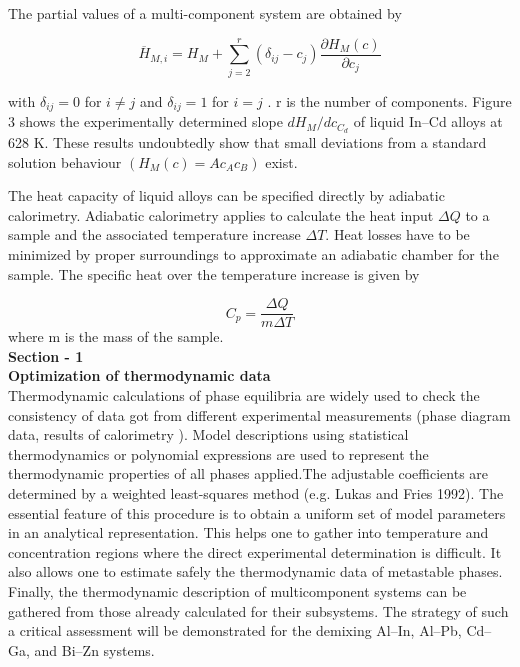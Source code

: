 \documentclass[12pt]{article}
\newcommand*{\1}{\hspace{1pt}}
\begin{document}
The partial values of a multi-component system are obtained by

    \begin{equation}
        \overline{H} _{M,i} = H _M + \sum_{j = 2}^{r} (\delta _{ij} - c _j)\frac{\partial H _M{(c)}}{\partial c _j}   
    \end{equation} 

with $ \delta  _{ij} =0 $ for $i \neq  j$ and $ \delta  _{ij} =1 $ for $i = j$ . r is the 
number of components. Figure 3 shows the experimentally determined slope $ d H _M / dc _{C _d} $ 
of liquid In–Cd alloys at 628 K. These results
undoubtedly show that small deviations from a standard solution behaviour $ (H _M (c) = Ac _Ac _B) $
exist.

The heat capacity of liquid alloys can be specified directly by adiabatic calorimetry.
Adiabatic calorimetry applies to calculate the heat input $ \Delta Q $ to a sample and the 
associated temperature increase $ \Delta T $.
Heat losses have to be minimized by proper surroundings to approximate an adiabatic
chamber for the sample. The specific heat over the temperature increase is given by 


    \begin{equation}
        C _p = \frac{\Delta Q}{m\Delta T} 
    \end{equation}   
where m is the mass of the sample.\\

\begin{adjustbox}{center,caption={Calorimetrically determined slope of the enthalpy of mixing of liquid Cd–In alloy at
    628 K (after Predel and Oehme 1977). },label={somelabel},nofloat=figure,vspace=\bigskipamount}
\end{adjustbox}

\textbf{Section - 1}\\

\textbf{Optimization of thermodynamic data}  \\

Thermodynamic calculations of phase equilibria are widely used to check the consistency
of data got from different experimental measurements (phase diagram data, results of
calorimetry ). Model descriptions using statistical
thermodynamics or polynomial expressions are used to represent the thermodynamic
properties of all phases applied.The adjustable coefficients are determined by a weighted
least-squares method (e.g. Lukas and Fries 1992). The essential feature of this procedure
is to obtain a uniform set of model parameters in an analytical representation. This helps
one to gather into temperature and concentration regions where the direct experimental
determination is difficult. It also allows one to estimate safely the thermodynamic data of
metastable phases. Finally, the thermodynamic description of multicomponent systems can
be gathered from those already calculated for their subsystems. The strategy of such a
critical assessment will be demonstrated for the demixing Al–In, Al–Pb, Cd–Ga, and Bi–Zn
systems. \\
\end{document}
